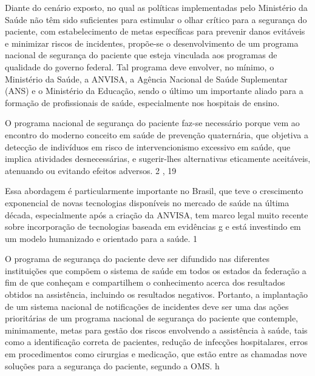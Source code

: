 \documentclass{article}
\begin{document}

Diante do cenário exposto, no qual as políticas implementadas pelo Ministério da Saúde não
        têm sido suficientes para estimular o olhar crítico para a segurança do paciente, com
        estabelecimento de metas específicas para prevenir danos evitáveis e minimizar riscos de
        incidentes, propõe-se o desenvolvimento de um programa nacional de segurança do paciente que
        esteja vinculada aos programas de qualidade do governo federal. Tal programa deve envolver,
        no mínimo, o Ministério da Saúde, a ANVISA, a Agência Nacional de Saúde Suplementar (ANS) e
        o Ministério da Educação, sendo o último um importante aliado para a formação de
        profissionais de saúde, especialmente nos hospitais de ensino.

O programa nacional de segurança do paciente faz-se necessário porque vem ao encontro do
        moderno conceito em saúde de prevenção quaternária, que objetiva a detecção de indivíduos em
        risco de intervencionismo excessivo em saúde, que implica atividades desnecessárias, e
        sugerir-lhes alternativas eticamente aceitáveis, atenuando ou evitando efeitos adversos.
2%
,%
19%


Essa abordagem é particularmente importante no Brasil, que teve o crescimento exponencial
        de novas tecnologias disponíveis no mercado de saúde na última década, especialmente após a
        criação da ANVISA, tem marco legal muito recente sobre incorporação de tecnologias baseada
        em evidências %
g%
 e está investindo em um modelo humanizado e orientado para a saúde. %
1%


O programa de segurança do paciente deve ser difundido nas diferentes instituições que
        compõem o sistema de saúde em todos os estados da federação a fim de que conheçam e
        compartilhem o conhecimento acerca dos resultados obtidos na assistência, incluindo os
        resultados negativos. Portanto, a implantação de um sistema nacional de notificações de
        incidentes deve ser uma das ações prioritárias de um programa nacional de segurança do
        paciente que contemple, minimamente, metas para gestão dos riscos envolvendo a assistência à
        saúde, tais como a identificação correta de pacientes, redução de infecções hospitalares,
        erros em procedimentos como cirurgias e medicação, que estão entre as chamadas nove soluções
        para a segurança do paciente, segundo a OMS. %
h%
\end{document}
